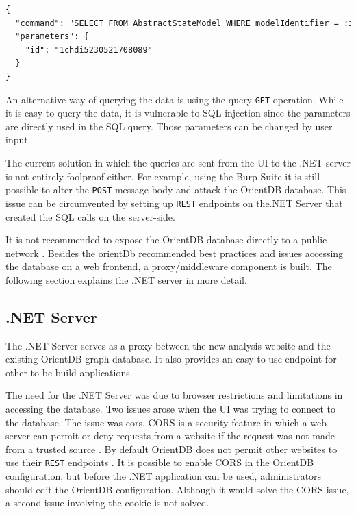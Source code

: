 \begin{lstlisting}[language=xml, caption=Get AbstractStateModel by the model identifier, label=code:example-body]
{
  "command": "SELECT FROM AbstractStateModel WHERE modelIdentifier = :id",
  "parameters": {
    "id": "1chdi5230521708089"
  }
}
\end{lstlisting}

An alternative way of querying the data is using the query \verb|GET| operation. While it is easy to query the data, it is vulnerable to SQL injection since the parameters are directly used in the SQL query. Those parameters can be changed by user input. 

The current solution in which the queries are sent from the UI to the .NET server is not entirely foolproof either. For example, using the Burp Suite it is still possible to alter the \verb|POST| message body and attack the OrientDB database. This issue can be circumvented by setting up \verb|REST| endpoints on the.NET Server that created the SQL calls on the server-side.

It is not recommended to expose the OrientDB database directly to a public network \cite{orientdb-security}. Besides the orientDb recommended best practices and issues accessing the database on a web frontend, a proxy/middleware component is built. The following section explains the .NET server in more detail. 

\subsection{.NET Server} \label{sec:net-server}
The .NET Server serves as a proxy between the new \testar analysis website and the existing OrientDB graph database. It also provides an easy to use endpoint for other to-be-build applications.

The need for the .NET Server was due to browser restrictions and limitations in accessing the database. Two issues arose when the UI was trying to connect to the database. The issue was \acrfull{cors}. CORS is a security feature in which a web server can permit or deny requests from a website if the request was not made from a trusted source \cite{cors}. By default OrientDB does not permit other websites to use their \verb|REST| endpoints \cite{orientdb-webserver}. It is possible to enable CORS in the OrientDB configuration, but before the .NET application can be used, administrators should edit the OrientDB configuration. Although it would solve the CORS issue, a second issue involving the cookie is not solved.

